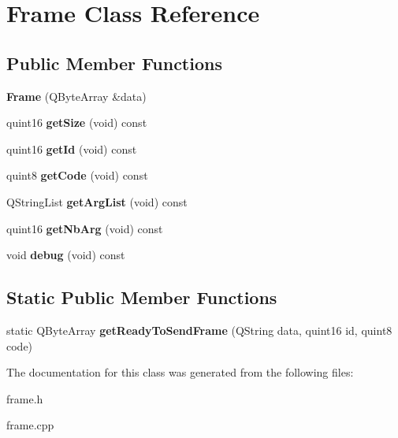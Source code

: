 \hypertarget{class_frame}{\section{Frame Class Reference}
\label{class_frame}
}
\subsection*{Public Member Functions}
\begin{DoxyCompactItemize}
\item 
\hypertarget{class_frame_a36692a453b1550fc431b9ba50a684c98}{{\bfseries Frame} (Q\-Byte\-Array \&data)}\label{class_frame_a36692a453b1550fc431b9ba50a684c98}

\item 
\hypertarget{class_frame_a9ea46ba1ea4701b14876872c5610add5}{quint16 {\bfseries get\-Size} (void) const }\label{class_frame_a9ea46ba1ea4701b14876872c5610add5}

\item 
\hypertarget{class_frame_a0391f25f60a4c67fa61fa9dd54662b3f}{quint16 {\bfseries get\-Id} (void) const }\label{class_frame_a0391f25f60a4c67fa61fa9dd54662b3f}

\item 
\hypertarget{class_frame_a25be583e195b64dd908e22071da8b899}{quint8 {\bfseries get\-Code} (void) const }\label{class_frame_a25be583e195b64dd908e22071da8b899}

\item 
\hypertarget{class_frame_a40dcc7a47334614839ed521f2f0bf738}{Q\-String\-List {\bfseries get\-Arg\-List} (void) const }\label{class_frame_a40dcc7a47334614839ed521f2f0bf738}

\item 
\hypertarget{class_frame_a72e3929d08a0dc1b290f0a2b3968b1d3}{quint16 {\bfseries get\-Nb\-Arg} (void) const }\label{class_frame_a72e3929d08a0dc1b290f0a2b3968b1d3}

\item 
\hypertarget{class_frame_a6a08ce2e43113cce5b79645f5f32c0e4}{void {\bfseries debug} (void) const }\label{class_frame_a6a08ce2e43113cce5b79645f5f32c0e4}

\end{DoxyCompactItemize}
\subsection*{Static Public Member Functions}
\begin{DoxyCompactItemize}
\item 
\hypertarget{class_frame_acc9a61b318a03c448b150502a04483d6}{static Q\-Byte\-Array {\bfseries get\-Ready\-To\-Send\-Frame} (Q\-String data, quint16 id, quint8 code)}\label{class_frame_acc9a61b318a03c448b150502a04483d6}

\end{DoxyCompactItemize}


The documentation for this class was generated from the following files\-:\begin{DoxyCompactItemize}
\item 
frame.\-h\item 
frame.\-cpp\end{DoxyCompactItemize}
